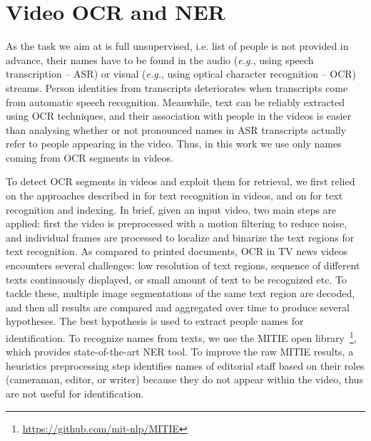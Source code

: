 \section{Video OCR and NER}
\label{sec:ocr_ner}
As the task we aim at is full unsupervised, i.e. list of people is not provided in advance, their names have to be found in the audio (\emph{e.g.}, using speech transcription -- ASR) or visual (\emph{e.g.}, using optical character recognition -- OCR) streams.
%
%
Person identities from transcripts deteriorates when transcripts come from automatic speech recognition. Meanwhile, text can be reliably extracted using OCR techniques, and their association with people in the videos is easier than analysing whether or not pronounced names in ASR transcripts actually refer to people appearing in the video. Thus, in this work we use only names coming from OCR segments in videos.

To detect OCR segments in videos and exploit them for retrieval, we first relied on the approaches described in \cite{chen-pr04,odobez-prl05} for text recognition in videos, and on \cite{daddaoua:ICDAR:05,vincia:tmm:05} for text recognition and indexing.
%
In brief, given an input video, two main steps are applied: first the video is preprocessed with a motion filtering to reduce noise, and individual frames are processed to localize and binarize the text regions for text recognition.
%
As compared to printed documents, OCR in TV news videos encounters several challenges: low resolution of text regions, sequence of different texts continuously displayed, or small amount of text to be recognized etc.
%
To tackle these, multiple image segmentations of the same text region are decoded, and then all results are compared and aggregated over time to produce several hypotheses. 
%
The best hypothesis is used to extract people names for identification. To recognize names from texts, we use the MITIE open library~\footnote{\url{https://github.com/mit-nlp/MITIE}}, which provides state-of-the-art NER tool. 
%
%
To improve the raw MITIE results, a heuristics preprocessing step identifies names of editorial staff based on their roles (cameraman, editor, or writer) because they do not appear within the video, thus are not useful for identification.

\endinput
